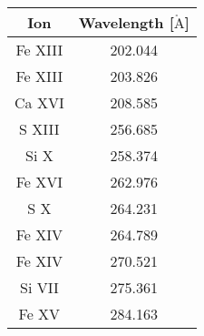 \begin{tabular}{|c|c|}
\hline
Ion & Wavelength [$\mathrm{\mathring{A}}$] \\
\hline\hline
Fe XIII & 202.044 \\
Fe XIII & 203.826 \\
Ca XVI & 208.585 \\
S XIII & 256.685 \\
Si X & 258.374 \\
Fe XVI & 262.976 \\
S X & 264.231 \\
Fe XIV & 264.789 \\
Fe XIV & 270.521 \\
Si VII & 275.361 \\
Fe XV & 284.163 \\
\hline
\end{tabular}
